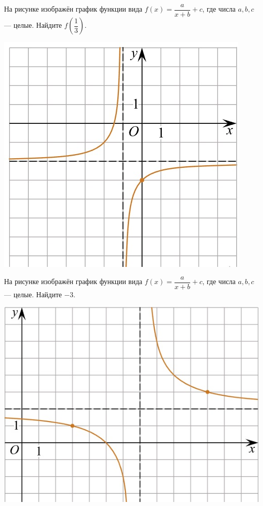\begin{class}[number=5]
\begin{listofex}
\begin{minipage}[c]{0.25\textwidth}
		\end{minipage}
		\item
		\begin{minipage}[t]{0.67\textwidth}
			На рисунке изображён график функции вида \(f(x)=\dfrac{a}{x+b}+c\), где числа \(a, b, c\) --- целые. Найдите \(f\left(\dfrac{1}{3}\right)\).
		\end{minipage}
		\begin{minipage}[c]{0.25\textwidth}
			\includegraphics[align=t, width=\textwidth]{pics/G111M4C5-1.jpg}
		\end{minipage}
		\item
		\begin{minipage}[t]{0.62\textwidth}
			На рисунке изображён график функции вида \(f(x)=\dfrac{a}{x+b}+c\), где числа \(a, b, c\) --- целые. Найдите \(-3\).
		\end{minipage}
		\begin{minipage}[c]{0.35\textwidth}
			\includegraphics[align=t, width=\textwidth]{pics/G111M4C5-2.jpg}

\end{minipage}
\end{listofex}
\end{class}
